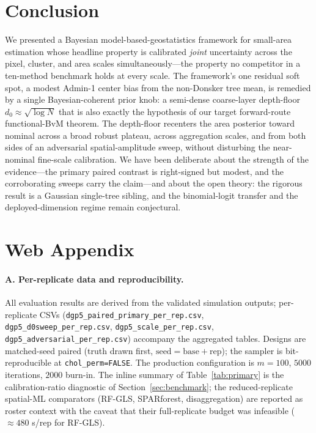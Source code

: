\documentclass[11pt]{article}
\theoremstyle{remark}
\newcommand{\dz}{d_0}
\begin{document}
\section{Conclusion}\label{sec:conclusion}

We presented a Bayesian model-based-geostatistics framework for small-area
estimation whose headline property is calibrated \emph{joint} uncertainty across
the pixel, cluster, and area scales simultaneously---the property no competitor in
a ten-method benchmark holds at every scale. The framework's one residual soft
spot, a modest Admin-1 center bias from the non-Donsker tree mean, is remedied by a
single Bayesian-coherent prior knob: a semi-dense coarse-layer depth-floor
$\dz\approx\sqrt{\log N}$ that is also exactly the hypothesis of our target
forward-route functional-BvM theorem. The depth-floor recenters the area posterior
toward nominal across a broad robust plateau, across aggregation scales, and from
both sides of an adversarial spatial-amplitude sweep, without disturbing the
near-nominal fine-scale calibration. We have been deliberate about the strength of
the evidence---the primary paired contrast is right-signed but modest, and the
corroborating sweeps carry the claim---and about the open theory: the rigorous
result is a Gaussian single-tree sibling, and the binomial-logit transfer and the
deployed-dimension regime remain conjectural.

\section*{Web Appendix}\label{sec:appendix}

\paragraph{A. Per-replicate data and reproducibility.}
{\sloppy
All evaluation results are derived from the validated simulation outputs;
per-replicate CSVs (\texttt{dgp5\_paired\_primary\_per\_rep.csv},
\texttt{dgp5\_d0sweep\_per\_rep.csv}, \texttt{dgp5\_scale\_per\_rep.csv},
\texttt{dgp5\_adversarial\_per\_rep.csv}) accompany the aggregated tables. Designs
are matched-seed paired (truth drawn first, $\mathrm{seed}=\mathrm{base}+
\mathrm{rep}$); the sampler is bit-reproducible at \texttt{chol\_perm=FALSE}. The
production configuration is $m=100$, $5000$ iterations, $2000$ burn-in. The
inline summary of Table~\ref{tab:primary} is the calibration-ratio diagnostic of
Section~\ref{sec:benchmark}; the reduced-replicate spatial-ML comparators
(RF-GLS, SPARforest, disaggregation) are reported as roster context with the
caveat that their full-replicate budget was infeasible ($\approx480$ s/rep for
RF-GLS).\par}
\end{document}
